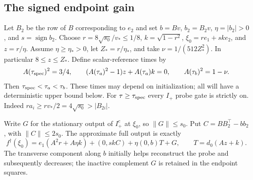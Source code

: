 \documentclass[11pt]{article}
\theoremstyle{remark}
\begin{document}
\subsection{The signed endpoint gain}

Let $B_2$ be the row of $B$ corresponding to $e_2$ and set
$b=Bv$, $b_2=B_2v$, $\eta=|b_2|>0$, and $s=\operatorname{sign}b_2$.
Choose $r=8\sqrt{s_0}/v_*\le1/8$, $k=\sqrt{1-r^2}$,
$\xi_0=re_1+sk e_2$, and $z=r/\eta$.
Assume $\eta\ge\eta_*>0$, let $Z_*=r/\eta_*$, and take
$\nu=1/(512Z_*^2)$. In particular $8\le z\le Z_*$.
Define scalar-reference times by
\begin{equation}\label{sbsep:snapshot-times}
 A(\tau_{\rm spec})^2=3/4,\qquad
 (A(\tau_a)^2-1)z+A(\tau_a)k=0,\qquad
 A(\tau_b)^2=1-\nu.
\end{equation}
Then $\tau_{\rm spec}<\tau_a<\tau_b$. These times may depend on
initialization; all will have a deterministic upper bound below.
For $\tau\ge\tau_{\rm spec}$ every $I_+$ probe gate is strictly on.
Indeed $ra_i\ge rv_*/2=4\sqrt{s_0}>|B_{2i}|$.

Write $G$ for the stationary output of $I_+^c$ at $\xi_0$, so
$\|G\|\le s_0$. Put $C=BB_2^\top-bb_2$, with $\|C\|\le2s_0$.
The approximate full output is exactly
\begin{equation}\label{sbsep:probe-reference}
 f^\dagger(\xi_0)=
 e_1(A^2r+A\eta k)+(0,skC)+\eta(0,b)T+G,
 \qquad T=d_0(Az+k).
\end{equation}
The transverse component along $b$ initially helps reconstruct the
probe and subsequently decreases; the inactive complement $G$ is
retained in the endpoint squares.
\end{document}
